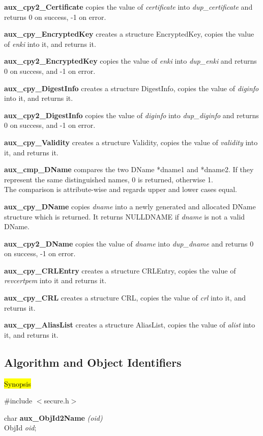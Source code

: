 {\bf aux\_cpy2\_Certificate} copies the value of {\em certificate} into {\em dup\_certificate}
and returns 0 on success, -1 on error.

{\bf aux\_cpy\_EncryptedKey} creates a structure EncryptedKey, copies the value
of {\em enki} into it, and returns it.

{\bf aux\_cpy2\_EncryptedKey} copies the value of {\em enki} into {\em dup\_enki}
and returns 0 on success, and -1 on error.

{\bf aux\_cpy\_DigestInfo} creates a structure DigestInfo, copies the value
of {\em diginfo} into it, and returns it.

{\bf aux\_cpy2\_DigestInfo} copies the value of {\em diginfo} into {\em dup\_diginfo}
and returns 0 on success, and -1 on error.

{\bf aux\_cpy\_Validity} creates a structure Validity, copies the value
of {\em validity} into it, and returns it.

{\bf aux\_cmp\_DName} compares the two DName *dname1 and *dname2.
If they represent the same distinguished names,
0 is returned, otherwise 1. \\
The comparison is attribute-wise
and regards upper and lower cases equal.

{\bf aux\_cpy\_DName} copies {\em dname} into a newly generated and
allocated DName structure which is returned. It returns NULLDNAME
if {\em dname} is not a valid DName.

{\bf aux\_cpy2\_DName} copies the value of {\em dname} into {\em dup\_dname}
and returns 0 on success, -1 on error.

{\bf aux\_cpy\_CRLEntry} creates a structure CRLEntry, copies the value
of {\em revcertpem} into it and returns it.

{\bf aux\_cpy\_CRL} creates a structure CRL, copies the value
of {\em crl} into it, and returns it.

{\bf aux\_cpy\_AliasList} creates a structure AliasList, copies the value
of {\em alist} into it, and returns it.



\subsection{Algorithm and Object Identifiers}
\label{aux_aid}
\hl{Synopsis}

\#include $<$secure.h$>$ 

char {\bf *aux\_ObjId2Name} {\em (oid)} \\
ObjId {\em *oid};

